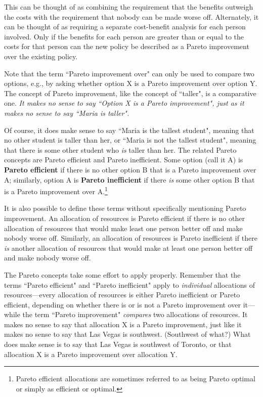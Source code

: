 This can be thought of as combining the requirement that the benefits outweigh the costs with the requirement that nobody can be made worse off. Alternately, it can be thought of as requiring a separate cost-benefit analysis for each person involved. Only if the benefits for each person are greater than or equal to the costs for that person can the new policy be described as a Pareto improvement over the existing policy.

Note that the term ``Pareto improvement over" can only be used to compare two options, e.g., by asking whether option X is a Pareto improvement over option Y. The concept of Pareto improvement, like the concept of ``taller", is a comparative one. \emph{It makes no sense to say ``Option X is a Pareto improvement", just as it makes no sense to say ``Maria is taller".}

Of course, it does make sense to say ``Maria is the tallest student", meaning that no other student is taller than her, or ``Maria is not the tallest student", meaning that there is some other student who \emph{is} taller than her. The related Pareto concepts are Pareto efficient and Pareto inefficient. Some option (call it A) is \textbf{Pareto efficient} if there is no other option B that is a Pareto improvement over A; similarly, option A is \textbf{Pareto inefficient} if there \emph{is} some other option B that is a Pareto improvement over A.\footnote{Pareto efficient allocations are sometimes referred to as being Pareto optimal or simply as efficient or optimal.}

It is also possible to define these terms without specifically mentioning Pareto improvement. An allocation of resources is Pareto efficient if there is no other allocation of resources that would make least one person better off and make nobody worse off. Similarly, an allocation of resources is Pareto inefficient if there \emph{is} another allocation of resources that would make at least one person better off and make nobody worse off.

The Pareto concepts take some effort to apply properly. Remember that the terms ``Pareto efficient" and ``Pareto inefficient" apply to \emph{individual} allocations of resources---every allocation of resources is either Pareto inefficient or Pareto efficient, depending on whether there is or is not a Pareto improvement over it---while the term ``Pareto improvement" \emph{compares} two allocations of resources. It makes no sense to say that allocation X is a Pareto improvement, just like it makes no sense to say that Las Vegas is southwest. (Southwest of what?) What does make sense is to say that Las Vegas is southwest of Toronto, or that allocation X is a Pareto improvement over allocation Y.

